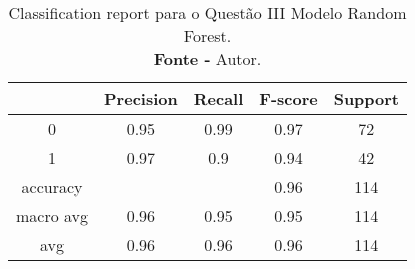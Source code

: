 % 
\begin{table}[H]
    \centering
    \begin{tabular}{@{}ccccc@{}}
    \toprule
     & \textbf{Precision} & \textbf{Recall} &\textbf{F-score} & \textbf{Support} \\ \midrule 
    0 & 0.95 & 0.99 & 0.97 & 72 \\ 
    1 & 0.97 & 0.9 & 0.94 & 42 \\ 
    accuracy &  &  & 0.96 & 114 \\ 
    macro avg & 0.96 & 0.95 & 0.95 & 114 \\ 
    avg & 0.96 & 0.96 & 0.96 & 114 \\ \bottomrule 
    \end{tabular}
    \caption{Classification report para o Questão III Modelo Random Forest. \\ \textbf{Fonte -} Autor.}
    \label{tab: classification-report-Questão III Modelo Random Forest}
\end{table}